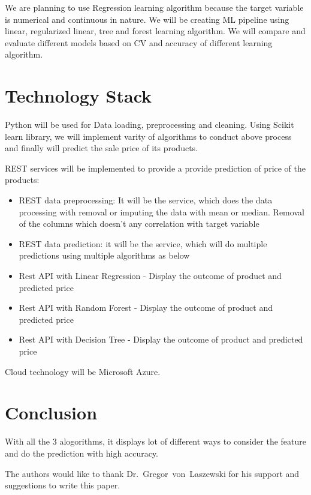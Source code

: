 We are planning to use Regression learning algorithm because the target variable is 
numerical and continuous in nature. We will be creating ML pipeline using linear, 
regularized linear, tree and forest learning algorithm. We will compare and evaluate 
different models based on CV and accuracy of different learning algorithm.

\section{Technology Stack}

Python will be used for Data loading, preprocessing and cleaning. Using Scikit learn 
library, we will implement varity of algorithms to conduct above process and finally 
will predict the sale price of its products.

REST services will be implemented to provide a provide prediction of price of the 
products:

\begin{itemize}
\item REST data preprocessing: It will be the service, which does the data processing 
with removal or imputing the data with mean or median. Removal of the columns which 
doesn’t any correlation with target variable
\item REST data prediction: it will be the service, which will do multiple predictions 
using multiple algorithms as below

\item Rest API with Linear Regression - Display the outcome of product and predicted 
price
\item Rest API with Random Forest - Display the outcome of product and predicted price
\item Rest API with Decision Tree - Display the outcome of product and predicted price
\end{itemize}

Cloud technology will be Microsoft Azure.

\section{Conclusion}

With all the 3 alogorithms, it displays lot of different ways to consider the feature
and do the prediction with high accuracy.


\begin{acks}

  The authors would like to thank Dr.~Gregor~von~Laszewski for his
  support and suggestions to write this paper.

\end{acks}


 

